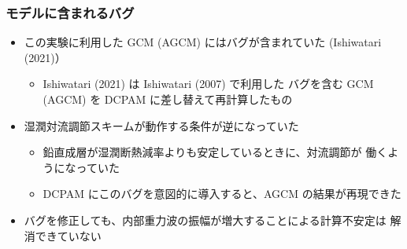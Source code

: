 \documentclass[aspectratio=149,9pt,]{beamer}
\begin{document}
\begin{frame}
	\frametitle{モデルに含まれるバグ}
	\begin{itemize}
		\item この実験に利用した GCM (AGCM) にはバグが含まれていた (Ishiwatari \etal (2021)）
			\begin{itemize}
				\item Ishiwatari \etal (2021) は Ishiwatari \etal (2007) で利用した
					バグを含む GCM (AGCM) を DCPAM に差し替えて再計算したもの
			\end{itemize}
		\item 湿潤対流調節スキームが動作する条件が逆になっていた
			\begin{itemize}
				\item 鉛直成層が湿潤断熱減率よりも安定しているときに、対流調節が
					働くようになっていた
				\item DCPAM にこのバグを意図的に導入すると、AGCM の結果が再現できた
			\end{itemize}
		\item バグを修正しても、内部重力波の振幅が増大することによる計算不安定は
			解消できていない
	\end{itemize}
\end{frame}
\end{document}
